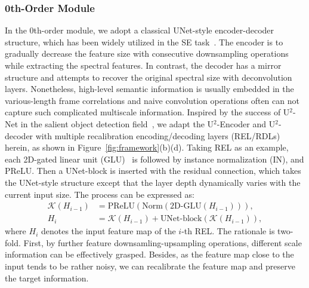 \documentclass{article}
\begin{document}
\subsubsection{0th-Order Module}
\label{Zero-order-module}
In the 0th-order module, we adopt a classical UNet-style encoder-decoder structure, which has been widely utilized in the SE task~{\cite{tan2020learning,li2021two}}. The encoder is to gradually decrease the feature size with consecutive downsampling operations while extracting the spectral features. In contrast, the decoder has a mirror structure and attempts to recover the original spectral size with deconvolution layers. Nonetheless, high-level semantic information is usually embedded in the various-length frame correlations and naive convolution operations often can not capture such complicated multiscale information. Inspired by the success of U$^{2}$-Net in the salient object detection field~{\cite{qin2020u2}}, we adapt the U$^{2}$-Encoder and U$^{2}$-decoder with multiple recalibration encoding/decoding layers (REL/RDLs) herein, as shown in Figure~{\ref{fig:framework}}(b)(d). Taking REL as an example, each 2D-gated linear unit (GLU)~{\cite{dauphin2017language}} is followed by instance normalization (IN), and PReLU. Then a UNet-block is inserted with the residual connection, which takes the UNet-style structure except that the layer depth dynamically varies with the current input size. The process can be expressed as:
\begin{align}\label{eqn16}
\mathcal{K}\left(H_{i-1}\right) &= \text{PReLU}\left(\text{Norm}\left(\text{2D-GLU}\left(H_{i-1}\right)\right)\right),\\
H_{i} &= \mathcal{K}\left(H_{i-1}\right) + \text{UNet-block}\left(\mathcal{K}\left(H_{i-1}\right)\right),
\end{align}
where $H_{i}$ denotes the input feature map of the $i$-th REL. The rationale is two-fold. First, by further feature downsamling-upsampling operations, different scale information can be effectively grasped. Besides, as the feature map close to the input tends to be rather noisy, we can recalibrate the feature map and preserve the target information.
\end{document}
